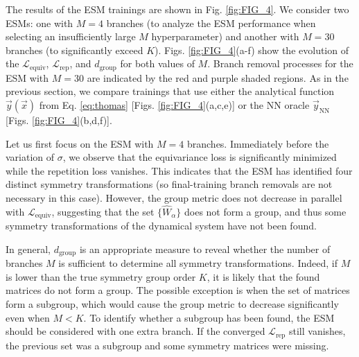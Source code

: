 The results of the ESM trainings are shown in Fig. \ref{fig:FIG_4}. We consider two ESMs: one with $M = 4$ branches (to analyze the ESM performance when selecting an insufficiently large $M$ hyperparameter) and another with $M = 30$ branches (to significantly exceed $K$). Figs. \ref{fig:FIG_4}(a-f) show the evolution of the $\mathcal{L}_{\mathrm{equiv}}$, $\mathcal{L}_{\mathrm{rep}}$, and $d_{\mathrm{group}}$ for both values of $M$. Branch removal processes for the ESM with $M=30$ are indicated by the red and purple shaded regions. As in the previous section, we compare trainings that use either the analytical function $\vec{y}(\vec{x})$ from Eq. \ref{eq:thomas} [Figs. \ref{fig:FIG_4}(a,c,e)] or the NN oracle $\vec{y}_{\mathrm{NN}}$ [Figs. \ref{fig:FIG_4}(b,d,f)].


Let us first focus on the ESM with $M = 4$ branches. Immediately before the variation of $\sigma$, we observe that the equivariance loss is significantly minimized while the repetition loss vanishes. This indicates that the ESM has identified four distinct symmetry transformations (so final-training branch removals are not necessary in this case). However, the group metric does not decrease in parallel with $\mathcal{L}_{\mathrm{equiv}}$, suggesting that the set $\{ \hat{W}_{\alpha}\}$ does not form a group, and thus some symmetry transformations of the dynamical system have not been found.

In general, $d_{\mathrm{group}}$ is an appropriate measure to reveal whether the number of branches $M$ is sufficient to determine all symmetry transformations. Indeed, if $M$ is lower than the true symmetry group order $K$, it is likely that the found matrices do not form a group. The possible exception is when the set of matrices form a subgroup, which would cause the group metric to decrease significantly even when $M < K$. To identify whether a subgroup has been found, the ESM should be considered with one extra branch. If the converged $\mathcal{L}_{\mathrm{rep}}$ still vanishes, the previous set was a subgroup and some symmetry matrices were missing.



